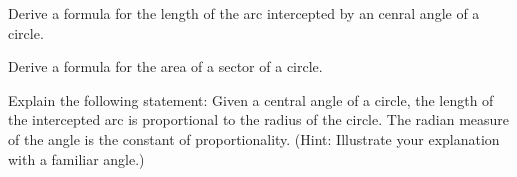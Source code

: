 \begin{prob}
Derive a formula for the length of the arc intercepted by an cenral angle of a circle.  
\end{prob}

\begin{prob}
Derive a formula for the area of a sector of a circle.  
\end{prob}

\begin{prob}
Explain the following statement:  Given a central angle of a circle, the length of the intercepted arc is proportional to the radius of the circle.  The radian measure of the angle is the constant of proportionality.  (Hint:  Illustrate your explanation with a familiar angle.)
\end{prob}

